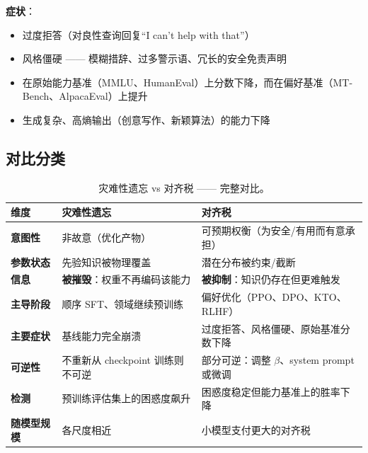 \textbf{症状}：

\begin{itemize}
  \item 过度拒答（对良性查询回复“I can't help with that”）
  \item 风格僵硬 —— 模糊措辞、过多警示语、冗长的安全免责声明
  \item 在原始能力基准（MMLU、HumanEval）上分数下降，而在偏好基准（MT-Bench、AlpacaEval）上提升
  \item 生成复杂、高熵输出（创意写作、新颖算法）的能力下降
\end{itemize}

\subsection{对比分类}
\label{comparative-taxonomy}

\begin{table}[ht!]
\centering\small
\caption{灾难性遗忘 vs 对齐税 —— 完整对比。}
\noindent\begin{tabularx}{\linewidth}{@{}l Z{0.91} Z{1.09}@{}}
\toprule
\textbf{维度} & \textbf{灾难性遗忘} & \textbf{对齐税} \\
\midrule
\textbf{意图性} & 非故意（优化产物） & 可预期权衡（为安全/有用而有意承担） \\
\textbf{参数状态} & 先验知识被物理覆盖 & 潜在分布被约束/截断 \\
\textbf{信息} & \textbf{被摧毁}：权重不再编码该能力 & \textbf{被抑制}：知识仍存在但更难触发 \\
\textbf{主导阶段} & 顺序 SFT、领域继续预训练 & 偏好优化（PPO、DPO、KTO、RLHF） \\
\textbf{主要症状} & 基线能力完全崩溃 & 过度拒答、风格僵硬、原始基准分数下降 \\
\textbf{可逆性} & 不重新从 checkpoint 训练则不可逆 & 部分可逆：调整 $\beta$、system prompt 或微调 \\
\textbf{检测} & 预训练评估集上的困惑度飙升 & 困惑度稳定但能力基准上的胜率下降 \\
\textbf{随模型规模} & 各尺度相近 & 小模型支付更大的对齐税 \\
\bottomrule
\end{tabularx}
\end{table}

